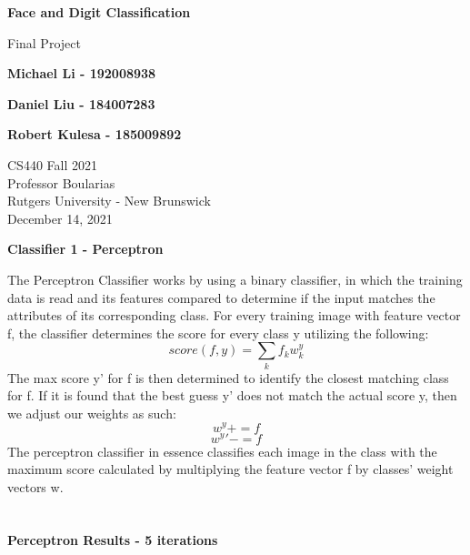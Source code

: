 \documentclass[11pt]{article}
\begin{document}
    \begin{titlepage}
        \begin{center}
            \vspace{1cm}

            \Huge
            \textbf{Face and Digit Classification}

            \vspace{0.5cm}
            \LARGE
            Final Project

            \vspace{1cm}

            \textbf{Michael Li - 192008938}

            \textbf{Daniel Liu - 184007283}

            \textbf{Robert Kulesa - 185009892}


            \vfill


            \vspace{0.8cm}

            \Large
            CS440 Fall 2021\\
            Professor Boularias\\
            Rutgers University - New Brunswick\\
            December 14, 2021

        \end{center}
    \end{titlepage}

    \begin{center}
        \Large
        \textbf{Classifier 1 - Perceptron}
    \end{center}
    \normalsize
        The Perceptron Classifier works by using a binary classifier, in which the training data is read and its features compared to determine if the input matches the attributes of its corresponding class. For every training image with feature vector f, the classifier determines the score for every class y utilizing the following:
    \[score(f,y) = \sum_{k}f_k w_k^y\]
    The max score y' for f is then determined to identify the closest matching class for f. If it is found that the best guess y' does not match the actual score y, then we adjust our weights as such:
    \[w^y += f\]
    \[w^y' -= f\]
    The perceptron classifier in essence classifies each image in the class with the maximum score calculated by multiplying the feature vector f by classes' weight vectors w.\\
    \\\\
    \large
    \textbf{Perceptron Results - 5 iterations}
    \normalsize
\end{document}
